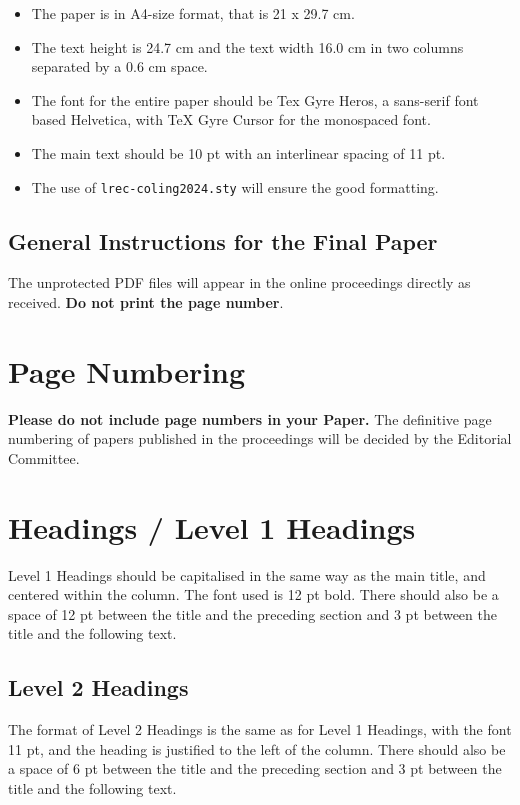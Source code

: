 \documentclass[10pt, a4paper]{article}
\begin{document}
\begin{itemize}
\item The paper is in A4-size format, that is 21 x 29.7 cm.
\item The text height is 24.7 cm and the text width 16.0 cm in two
  columns separated by a 0.6 cm space.
\item The font for the entire paper should be Tex Gyre Heros, a
  sans-serif font based Helvetica, with TeX Gyre Cursor for the
  monospaced font.
\item The main text should be 10 pt with an interlinear spacing of 11
  pt.
\item The use of \texttt{lrec-coling2024.sty} will ensure the good formatting.
\end{itemize}



\subsection{General Instructions for the Final Paper}

The unprotected PDF files will appear in the online proceedings directly as received. \textbf{Do not print the page number}.

\section{Page Numbering}

\textbf{Please do not include page numbers in your Paper.} The definitive page numbering of papers published in the proceedings will be decided by the Editorial Committee.

\section{Headings / Level 1 Headings} 

Level 1 Headings should be capitalised in the same way as the main title, and centered within the column. The font used is 12 pt bold. There should also be a space of 12 pt between the title and the preceding section and 3 pt between the title and the following text.

\subsection{Level 2 Headings}

The format of Level 2 Headings is the same as for Level 1 Headings, with the font  11 pt, and the heading is justified to the left of the column. There should also be a space of 6 pt between the title and the preceding section and 3 pt between the title and the following text.
\end{document}
